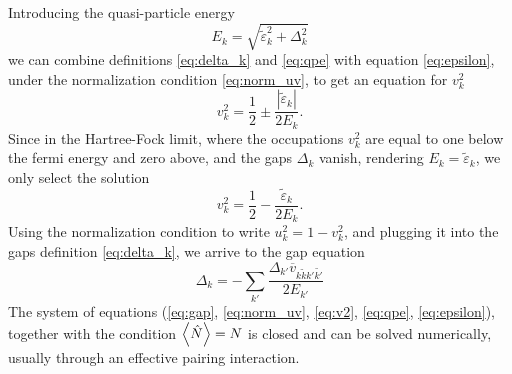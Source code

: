 Introducing the quasi-particle energy
\begin{equation}
    \label{eq:qpe}
    E_k = \sqrt{\tilde \varepsilon_k^2 +\Delta_k^2}
\end{equation}
we can combine definitions \eqref{eq:delta_k} and \eqref{eq:qpe} with equation \eqref{eq:epsilon}, under the normalization condition \eqref{eq:norm_uv}, to get an equation for $v_k^2$
\begin{equation}
    \label{eq:v2}
    v_k^2 = \frac 1 2 \pm \frac{|\tilde \varepsilon_k|}{2E_k}.
\end{equation}
Since in the Hartree-Fock limit, where the occupations $v_k^2$ are equal to one below the fermi energy and zero above, and the gaps $\Delta_k$ vanish, rendering $E_k=\tilde \varepsilon_k$, we only select the solution
\begin{equation}
v_k^2 = \frac 1 2 - \frac{\tilde \varepsilon_k}{2E_k}.
\end{equation}
Using the normalization condition to write $u_k^2=1-v_k^2$, and plugging it into the gaps definition \eqref{eq:delta_k}, we arrive to the gap equation
\begin{equation}
    \label{eq:gap}
    \Delta_k = - \sum_{k'}\frac{\Delta_{k'}\overline v_{k\tilde k k'\tilde{k'}}}{2E_{k'}}
\end{equation}
The system of equations (\ref{eq:gap}, \ref{eq:norm_uv}, \ref{eq:v2}, \ref{eq:qpe}, \ref{eq:epsilon}), together with the condition $\expval{\hat N}=N$ is closed and can be solved numerically, usually through an effective pairing interaction.
